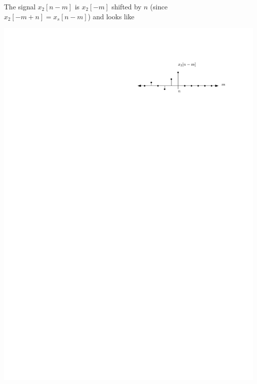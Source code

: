 The signal $x_2[n-m]$ is $x_2[-m]$ shifted by $n$ (since $x_2[-m+n]= x_s[n-m]$) and looks like
\begin{center}
  \includegraphics[scale=1]{graphics/dtconvolution-explain3.pdf}
\end{center}

